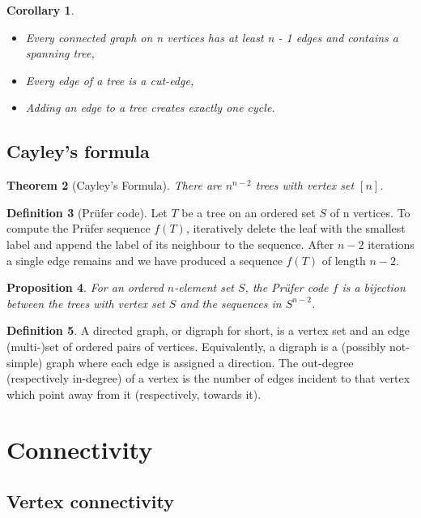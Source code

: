 \documentclass[10pt, fleqn, a4paper, landscape]{article}
\theoremstyle{plain} %
\newtheorem{thm}{Theorem}
\newtheorem{pro}[thm]{Proposition}
\newtheorem{cor}[thm]{Corollary}
\theoremstyle{remark} %
\theoremstyle{definition} %
\newtheorem{defi}[thm]{Definition}
\begin{document}
\begin{multicols}{3}
\begin{tiny}
\begin{cor}
\begin{itemize}
\item  Every connected graph on n vertices has at least n - 1 edges and contains a spanning tree,
\item Every edge of a tree is a cut-edge,
\item Adding an edge to a tree creates exactly one cycle.
\end{itemize}
\end{cor}

\subsection{Cayley’s formula}
\addtocounter{thm}{1}\addtocounter{thm}{1}
\begin{thm}[Cayley’s Formula]
There are $n^{n-2}$ trees with vertex set $[n]$.
\end{thm}

\begin{defi}[Prüfer code]
Let $T$ be a tree on an ordered set $S$ of n vertices. To compute the
Prüfer sequence $f(T)$, iteratively delete the leaf with the smallest label and append the label of its neighbour to the sequence. After $n - 2$ iterations a single edge remains and we have produced a sequence $f(T)$ of length $n - 2$.
\end{defi}
\addtocounter{thm}{1}
\begin{pro}
For an ordered $n$-element set $S$, the Prüfer code $f$ is a bijection between the trees with vertex set $S$ and the sequences in $S^{n-2}$.
\end{pro}
\addtocounter{thm}{1}
\begin{defi}
A directed graph, or digraph for short, is a vertex set and an edge (multi-)set of ordered pairs of vertices. Equivalently, a digraph is a (possibly not-simple) graph where each edge is assigned a direction. The out-degree (respectively in-degree) of a vertex is the number of edges
incident to that vertex which point away from it (respectively, towards it).
\end{defi}

\section{Connectivity}
\subsection{Vertex connectivity}


\end{tiny}
\end{multicols}
\end{document}
